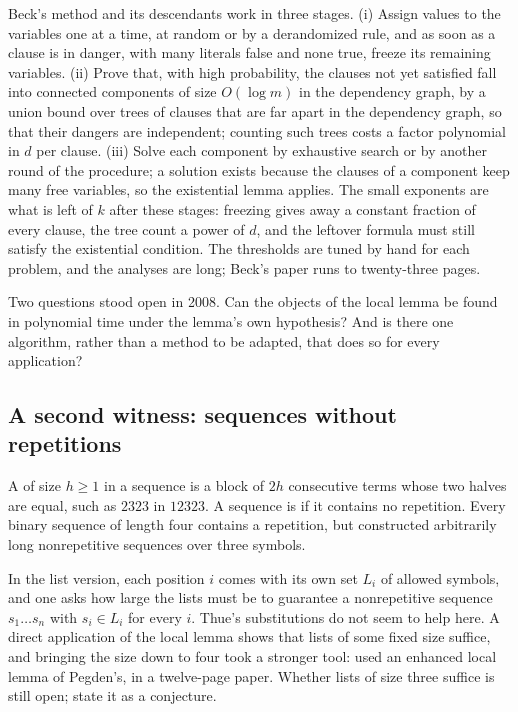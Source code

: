 \begin{refsection}
\begin{aside}
Beck's method and its descendants work in three stages. (i) Assign values to the variables one at a time, at random or by a derandomized rule, and as soon as a clause is in danger, with many literals false and none true, freeze its remaining variables. (ii) Prove that, with high probability, the clauses not yet satisfied fall into connected components of size $O(\log m)$ in the dependency graph, by a union bound over trees of clauses that are far apart in the dependency graph, so that their dangers are independent; counting such trees costs a factor polynomial in $d$ per clause. (iii) Solve each component by exhaustive search or by another round of the procedure; a solution exists because the clauses of a component keep many free variables, so the existential lemma applies. The small exponents are what is left of $k$ after these stages: freezing gives away a constant fraction of every clause, the tree count a power of $d$, and the leftover formula must still satisfy the existential condition. The thresholds are tuned by hand for each problem, and the analyses are long; Beck's paper runs to twenty-three pages.
\end{aside}

Two questions stood open in 2008. Can the objects of the local lemma be found in polynomial time under the lemma's own hypothesis? And is there one algorithm, rather than a method to be adapted, that does so for every application?

\subsection{A second witness: sequences without repetitions}\label{sec:compression:thue}

A  of size $h\ge1$ in a sequence is a block of $2h$ consecutive terms whose two halves are equal, such as $2323$ in $12323$. A sequence is  if it contains no repetition. Every binary sequence of length four contains a repetition, but \textcite{Thue1906} constructed arbitrarily long nonrepetitive sequences over three symbols.

In the list version, each position $i$ comes with its own set $L_i$ of allowed symbols, and one asks how large the lists must be to guarantee a nonrepetitive sequence $s_1\dots s_n$ with $s_i\in L_i$ for every $i$. Thue's substitutions do not seem to help here. A direct application of the local lemma shows that lists of some fixed size suffice, and bringing the size down to four took a stronger tool: \textcite{GrytczukPrzybyloZhu2011} used an enhanced local lemma of Pegden's, in a twelve-page paper. Whether lists of size three suffice is still open; \textcite{GrytczukKozikMicek2013} state it as a conjecture.


\end{refsection}
